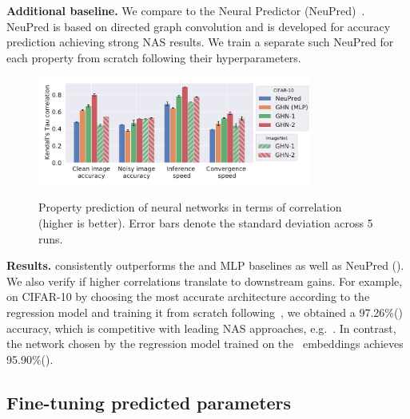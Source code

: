\textbf{Additional baseline.} 
We compare to the Neural Predictor (NeuPred)~\citep{wen2020neural}. NeuPred is based on directed graph convolution and is developed for accuracy prediction achieving strong NAS results. We train a separate such NeuPred for each property from scratch following their hyperparameters. 


\begin{figure}%
	\begin{center}
		{\includegraphics[align=c,width=0.8\textwidth]{property_prediction_hist.pdf}}
	\end{center}		
	\vspace{-15pt}
	\caption{\small Property prediction of neural networks in terms of correlation (higher is better). Error bars denote the standard deviation across 5 runs.}\label{fig:properties}
\end{figure}

\textbf{Results.}
\ghnours consistently outperforms the \ghnbase and MLP baselines as well as NeuPred (\fig{\ref{fig:properties}}). We also verify if higher correlations translate to downstream gains. For example, on CIFAR-10 by choosing the most accurate architecture according to the regression model and training it from scratch following~\citep{liu2018darts,zhang2018graph}, we obtained a 97.26\%() accuracy, which is competitive with leading NAS approaches, e.g.~\citep{liu2018darts,zhang2018graph,chen2019progressive,yang2020cars,he2020milenas,li2020sgas}. In contrast, the network chosen by the regression model trained on the \ghnbase~embeddings achieves 95.90\%().




\subsection{Fine-tuning predicted parameters\label{sec:finetune}}

